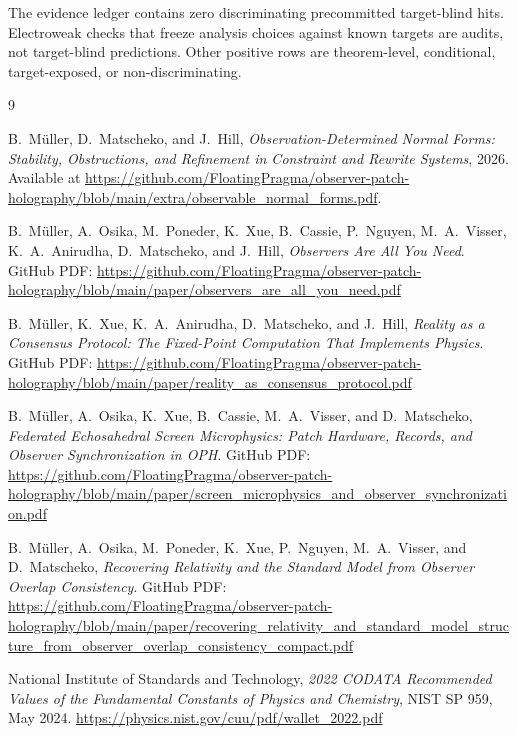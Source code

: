 \documentclass[11pt]{article}
\begin{document}
The evidence ledger contains zero discriminating precommitted target-blind hits. Electroweak checks that
freeze analysis choices against known targets are audits, not target-blind predictions.
Other positive rows are theorem-level, conditional, target-exposed, or non-discriminating.

\appendix


\begin{thebibliography}{9}

B.\ M\"uller, D.\ Matscheko, and J.\ Hill,
\emph{Observation-Determined Normal Forms: Stability, Obstructions, and Refinement in Constraint
and Rewrite Systems},
2026.\\
Available at \url{https://github.com/FloatingPragma/observer-patch-holography/blob/main/extra/observable_normal_forms.pdf}.

B.\ M\"uller, A.\ Osika, M.\ Poneder, K.\ Xue, B.\ Cassie, P.\ Nguyen, M.\ A.\ Visser, K.\ A.\ Anirudha, D.\ Matscheko, and J.\ Hill,
\emph{Observers Are All You Need}.
GitHub PDF:
\url{https://github.com/FloatingPragma/observer-patch-holography/blob/main/paper/observers_are_all_you_need.pdf}

B.\ M\"uller, K.\ Xue, K.\ A.\ Anirudha, D.\ Matscheko, and J.\ Hill,
\emph{Reality as a Consensus Protocol: The Fixed-Point Computation That Implements Physics}.
GitHub PDF:
\url{https://github.com/FloatingPragma/observer-patch-holography/blob/main/paper/reality_as_consensus_protocol.pdf}

B.\ M\"uller, A.\ Osika, K.\ Xue, B.\ Cassie, M.\ A.\ Visser, and D.\ Matscheko,
\emph{Federated Echosahedral Screen Microphysics: Patch Hardware, Records, and Observer Synchronization in OPH}.
GitHub PDF:
\url{https://github.com/FloatingPragma/observer-patch-holography/blob/main/paper/screen_microphysics_and_observer_synchronization.pdf}

B.\ M\"uller, A.\ Osika, M.\ Poneder, K.\ Xue, P.\ Nguyen, M.\ A.\ Visser, and D.\ Matscheko,
\emph{Recovering Relativity and the Standard Model from Observer Overlap Consistency}.
GitHub PDF:
\url{https://github.com/FloatingPragma/observer-patch-holography/blob/main/paper/recovering_relativity_and_standard_model_structure_from_observer_overlap_consistency_compact.pdf}

National Institute of Standards and Technology,
\emph{2022 CODATA Recommended Values of the Fundamental Constants of Physics and Chemistry},
NIST SP 959, May 2024.
\url{https://physics.nist.gov/cuu/pdf/wallet_2022.pdf}


\end{thebibliography}
\end{document}
